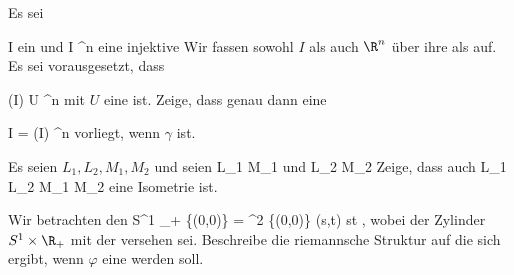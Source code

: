 {}
{

Es sei

\mavergleichskette
{\vergleichskette
{ I
}
{ \subseteq }{ \R
}
{  }{
}
{    }{
}
{   }{
}
}
{}{}{}
ein
und
\maabbdisp {\gamma} { I } { \R^n
} {}
eine injektive
Wir fassen sowohl $I$ als auch $\R^n$ über ihre
als
auf. Es sei vorausgesetzt, dass

\mavergleichskette
{\vergleichskette
{ \gamma(I)
}
{ \subseteq }{ U
}
{ \subseteq }{ \R^n
}
{    }{
}
{   }{
}
}
{}{}{}
mit $U$
eine
ist. Zeige, dass genau dann eine

\mavergleichskettedisp
{\vergleichskette
{ I
}
{ =} { \gamma(I)
}
{ \subseteq} { \R^n
}
{ } {
}
{ } {
}
}
{}{}{}
vorliegt, wenn  $\gamma$
ist.

}
{} {}

{}
{

Es seien $L_1,L_2,M_1,M_2$
und seien
 {L_1 } { M_1
} {}
und
 {L_2 } { M_2
} {}
Zeige, dass auch
 {L_1 \times L_2 } { M_1 \times M_2
} {}
eine Isometrie ist.

}
{} {}

{}
{

Wir betrachten den
\maabbeledisp {\varphi} {S^1 \times \R_+} { \Complex \setminus \{(0,0)\}  =  \R^2 \setminus \{(0,0)\}
} {(s,t) } { st
} {,}
wobei der Zylinder $S^1 \times \R_+$ mit der
versehen sei. Beschreibe die riemannsche Struktur auf
 die sich ergibt, wenn $\varphi$ eine
werden soll.

}
{} {}

